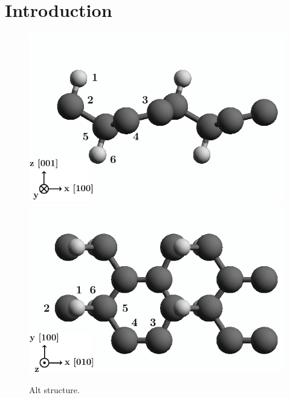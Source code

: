 \documentclass[prb,11pt,tightenlines,twocolumn,aps]{revtex4-1}
\begin{document}
\section{Introduction}
\blindtext
\begin{figure}[ht!]
    \centering
    \includegraphics[width=\linewidth]{figures/altstruc2}
    \label{fig:alt-struc-xz}
    \\
    \includegraphics[width=\linewidth]{figures/altstruc1}
    \label{fig:alt-struc-xy}
    \caption{Alt structure.}
    \label{fig:alt-struc}
\end{figure}
\end{document}
